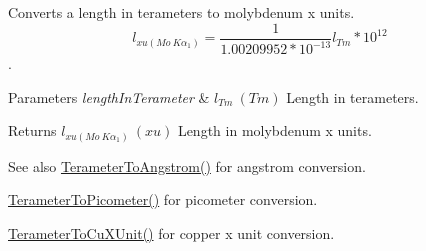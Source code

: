 Converts a length in terameters to molybdenum x units. \[ l_{xu(Mo\ K\alpha_1)}=\frac{1}{1.00209952*10^{-13}} l_{Tm} * 10^{12}\]. 


\begin{DoxyParams}{Parameters}
{\em length\+In\+Terameter} & $ l_{Tm}\ (Tm)$ Length in terameters. \\
\hline
\end{DoxyParams}
\begin{DoxyReturn}{Returns}
$ l_{xu(Mo\ K\alpha_1)}\ (xu)$ Length in molybdenum x units. 
\end{DoxyReturn}
\begin{DoxySeeAlso}{See also}
\mbox{\hyperlink{group___e_g_x_math-_conversions-_length_conversions-_s_i-_terameter-_non-_s_i_gaab75399e224bea4ea7ddb8bf5f557ee0}{Terameter\+To\+Angstrom()}} for angstrom conversion. 

\mbox{\hyperlink{group___e_g_x_math-_conversions-_length_conversions-_s_i-_terameter-_s_i_ga131f3ccf4db05a31f5bd5c9487da9a4e}{Terameter\+To\+Picometer()}} for picometer conversion. 

\mbox{\hyperlink{group___e_g_x_math-_conversions-_length_conversions-_s_i-_terameter-_non-_s_i_ga5eab9d29867c570350691cca342c9472}{Terameter\+To\+Cu\+X\+Unit()}} for copper x unit conversion. 
\end{DoxySeeAlso}
